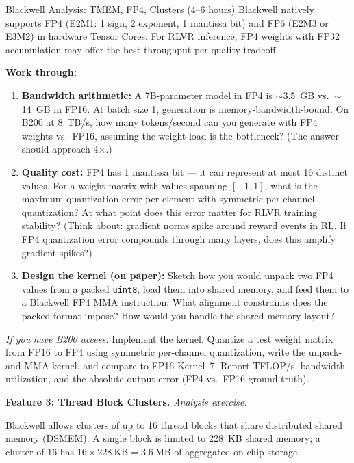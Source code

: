 \begin{exercise}{Blackwell Analysis: TMEM, FP4, Clusters (4--6 hours)}
Blackwell natively supports FP4 (E2M1: 1 sign, 2 exponent, 1 mantissa bit) and FP6 (E2M3 or E3M2) in hardware Tensor Cores. For RLVR inference, FP4 weights with FP32 accumulation may offer the best throughput-per-quality tradeoff.

\textbf{Work through:}
\begin{enumerate}
  \item \textbf{Bandwidth arithmetic:} A 7B-parameter model in FP4 is $\sim$3.5~GB vs.\ $\sim$14~GB in FP16. At batch size 1, generation is memory-bandwidth-bound. On B200 at 8~TB/s, how many tokens/second can you generate with FP4 weights vs.\ FP16, assuming the weight load is the bottleneck? (The answer should approach 4$\times$.)
  \item \textbf{Quality cost:} FP4 has 1 mantissa bit --- it can represent at most 16 distinct values. For a weight matrix with values spanning $[-1, 1]$, what is the maximum quantization error per element with symmetric per-channel quantization? At what point does this error matter for RLVR training stability? (Think about: gradient norms spike around reward events in RL. If FP4 quantization error compounds through many layers, does this amplify gradient spikes?)
  \item \textbf{Design the kernel (on paper):} Sketch how you would unpack two FP4 values from a packed \texttt{uint8}, load them into shared memory, and feed them to a Blackwell FP4 MMA instruction. What alignment constraints does the packed format impose? How would you handle the shared memory layout?
\end{enumerate}

\textit{If you have B200 access:} Implement the kernel. Quantize a test weight matrix from FP16 to FP4 using symmetric per-channel quantization, write the unpack-and-MMA kernel, and compare to FP16 Kernel~7. Report TFLOP/s, bandwidth utilization, and the absolute output error (FP4 vs.\ FP16 ground truth).

\medskip
\textbf{Feature 3: Thread Block Clusters.} \textit{Analysis exercise.}

Blackwell allows clusters of up to 16 thread blocks that share distributed shared memory (DSMEM). A single block is limited to 228~KB shared memory; a cluster of 16 has $16 \times 228~\text{KB} = 3.6~\text{MB}$ of aggregated on-chip storage.


\end{exercise}
